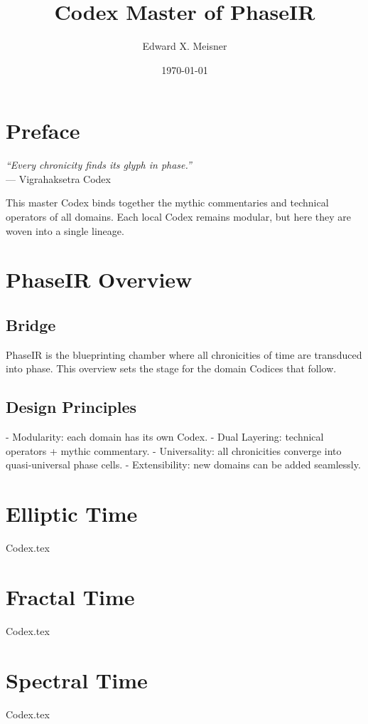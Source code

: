 \documentclass{book}
\title{Codex Master of PhaseIR}
\author{Edward X. Meisner}
\date{\today}
\begin{document}
\maketitle

\chapter*{Preface}
\begin{flushright}
\textit{“Every chronicity finds its glyph in phase.”} \\
— Vigrahaksetra Codex
\end{flushright}

This master Codex binds together the mythic commentaries and technical operators 
of all domains. Each local Codex remains modular, but here they are woven into 
a single lineage.

\chapter{PhaseIR Overview}
\section*{Bridge}
PhaseIR is the blueprinting chamber where all chronicities of time are transduced 
into phase. This overview sets the stage for the domain Codices that follow.

\section{Design Principles}
- Modularity: each domain has its own Codex.
- Dual Layering: technical operators + mythic commentary.
- Universality: all chronicities converge into quasi‑universal phase cells.
- Extensibility: new domains can be added seamlessly.

\chapter{Elliptic Time}
{Codex.tex}

\chapter{Fractal Time}
{Codex.tex}

\chapter{Spectral Time}
{Codex.tex}
\end{document}
